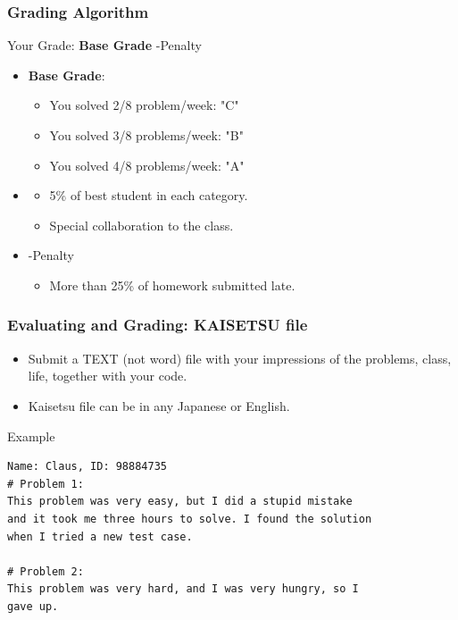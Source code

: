 \documentclass{beamer}
\begin{document}
\begin{frame}
  \frametitle{Grading Algorithm}

  Your Grade: {\bf Base Grade}  \alert{-Penalty}

  \begin{itemize}
    \item {\bf Base Grade}:
    \begin{itemize}
      \item You solved 2/8 problem/week: "C"
      \item You solved 3/8 problems/week: "B"
      \item You solved 4/8 problems/week: "A"
    \end{itemize}

    \bigskip

    \item {}
    \begin{itemize}
      \item 5\% of best student in each category.
      \item Special collaboration to the class.
    \end{itemize}

    \bigskip
    \item \alert{-Penalty}
    \begin{itemize}
      \item More than 25\% of homework submitted late.
    \end{itemize}
  \end{itemize}


\end{frame}

\begin{frame}[fragile]
  \frametitle{Evaluating and Grading: KAISETSU file}

  \begin{itemize}
    \item Submit a TEXT (not word) file with your impressions of the problems, class, life, together with your code.
    \item Kaisetsu file can be in any Japanese or English.
  \end{itemize}

  \bigskip

  \begin{exampleblock}{Example}
    {\smaller
\begin{verbatim}
Name: Claus, ID: 98884735
# Problem 1:
This problem was very easy, but I did a stupid mistake
and it took me three hours to solve. I found the solution
when I tried a new test case.

# Problem 2:
This problem was very hard, and I was very hungry, so I
gave up.
\end{verbatim}}
  \end{exampleblock}

\end{frame}
\end{document}
